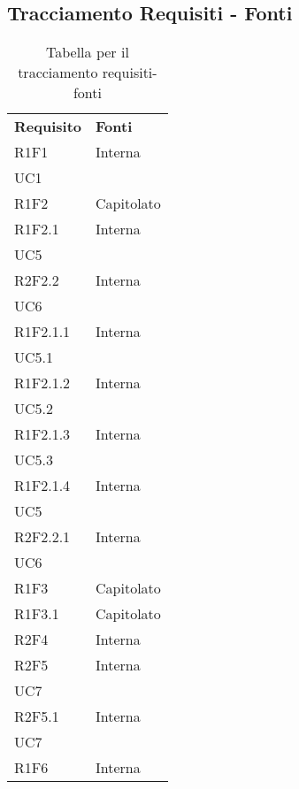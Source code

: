 \subsection{Tracciamento Requisiti - Fonti}

\renewcommand{\arraystretch}{2.2}

\begin{longtable}{|C{6.5cm}|C{6.5cm}|}
	\caption{Tabella per il tracciamento requisiti-fonti}\\
	\endfirsthead

	\hline
	
	\textbf{Requisito} & \textbf{Fonti} 
	\tabularnewline
	\endhead
	
	R1F1 & \centering Interna \\ UC1 \tabularnewline
	
	R1F2 & Capitolato \\
	
	R1F2.1 & \centering Interna \\ UC5 \tabularnewline
	
	R2F2.2 & \centering Interna \\ UC6 \tabularnewline
	
	R1F2.1.1 & \centering Interna \\ UC5.1 \tabularnewline
	
	R1F2.1.2 &   \centering Interna \\ UC5.2 \tabularnewline
	
	R1F2.1.3 &  \centering Interna \\ UC5.3 \tabularnewline
	
	R1F2.1.4 &  \centering Interna \\ UC5 \tabularnewline
	
	R2F2.2.1 &  \centering Interna \\ UC6 \tabularnewline
	
	R1F3 & Capitolato \\
	
	R1F3.1 & Capitolato \\	
	
	R2F4 &  Interna \\
	
	R2F5 &  \centering Interna \\ UC7 \tabularnewline
	
	R2F5.1 &  \centering Interna \\ UC7 \tabularnewline
	
	R1F6 & Interna \\
	

\end{longtable}
